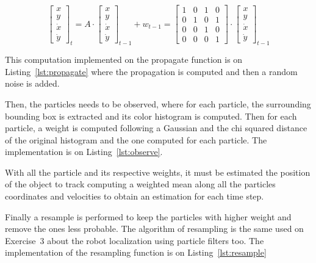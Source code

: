 \documentclass{ethz_report}
\begin{document}
\begin{equation}
    \begin{bmatrix}
        x \\ y \\ \dot{x} \\ \dot{y}
    \end{bmatrix}_t = A \cdot \begin{bmatrix}
        x \\ y \\ \dot{x} \\ \dot{y}
    \end{bmatrix}_{t-1} + w_{t-1} = \begin{bmatrix}
        1 & 0 & 1 & 0 \\ 0 & 1 & 0 & 1 \\ 0 & 0 & 1 & 0 \\ 0 & 0 & 0 & 1
    \end{bmatrix} \cdot \begin{bmatrix}
        x \\ y \\ \dot{x} \\ \dot{y}
    \end{bmatrix}_{t-1}
\end{equation}

This computation implemented on the propagate function is on Listing~\ref{lst:propagate} where the propagation is computed and then a random noise is added.



Then, the particles needs to be observed, where for each particle, the surrounding bounding box is extracted and its color histogram is computed.
Then for each particle, a weight is computed following a Gaussian and the chi squared distance of the original histogram and the one computed for each particle. The implementation is on Listing~\ref{lst:observe}.



With all the particle and its respective weights, it must be estimated the position of the object to track computing a weighted mean along all the particles coordinates and velocities to obtain an estimation for each time step.



Finally a resample is performed to keep the particles with higher weight and remove the ones less probable. The algorithm of resampling is the same used on Exercise~3 about the robot localization using particle filters too. The implementation of the resampling function is on Listing~\ref{lst:resample}
\end{document}
